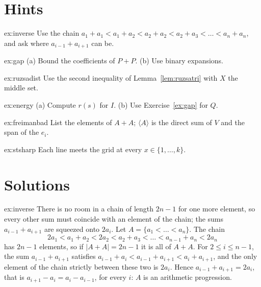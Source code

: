 \section{Hints}

\begin{hint}{ex:inverse}
Use the chain $a_1+a_1<a_1+a_2<a_2+a_2<a_2+a_3<\dots<a_n+a_n$, and ask where $a_{i-1}+a_{i+1}$ can be.
\end{hint}

\begin{hint}{ex:gap}
(a) Bound the coefficients of $P+P$. (b) Use binary expansions.
\end{hint}

\begin{hint}{ex:ruzsadist}
Use the second inequality of Lemma~\ref{lem:ruzsatri} with $X$ the middle set.
\end{hint}

\begin{hint}{ex:energy}
(a) Compute $r(s)$ for $I$. (b) Use Exercise~\ref{ex:gap} for $Q$.
\end{hint}

\begin{hint}{ex:freimanbad}
List the elements of $A+A$; $\langle A\rangle$ is the direct sum of $V$ and the span of the $e_i$.
\end{hint}

\begin{hint}{ex:stsharp}
Each line meets the grid at every $x\in\{1,\dots,k\}$.
\end{hint}

\section{Solutions}

\begin{solution}{ex:inverse}
\idea There is no room in a chain of length $2n-1$ for one more element, so every other sum must coincide with an element of the chain; the sums $a_{i-1}+a_{i+1}$ are squeezed onto $2a_i$.
\writeup Let $A=\{a_1<\dots<a_n\}$. The chain
\[
2a_1<a_1+a_2<2a_2<a_2+a_3<\dots<a_{n-1}+a_n<2a_n
\]
has $2n-1$ elements, so if $|A+A|=2n-1$ it is all of $A+A$. For $2\le i\le n-1$, the sum $a_{i-1}+a_{i+1}$ satisfies $a_{i-1}+a_i<a_{i-1}+a_{i+1}<a_i+a_{i+1}$, and the only element of the chain strictly between these two is $2a_i$. Hence $a_{i-1}+a_{i+1}=2a_i$, that is $a_{i+1}-a_i=a_i-a_{i-1}$, for every $i$: $A$ is an arithmetic progression.
\end{solution}

